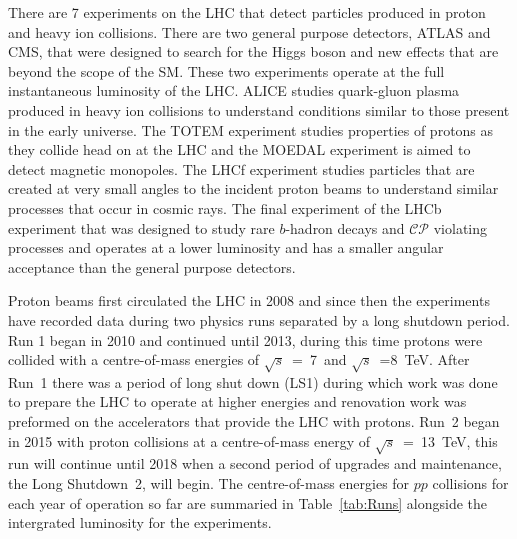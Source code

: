 There are 7 experiments on the LHC that detect particles produced in proton and heavy ion collisions. There are two general purpose detectors, ATLAS and CMS, that were designed to search for the Higgs boson and new effects that are beyond the scope of the SM. These two experiments operate at the full instantaneous luminosity of the LHC. %
ALICE studies quark-gluon plasma produced in heavy ion collisions to understand conditions similar to those present in the early universe. The TOTEM experiment studies properties of protons as they collide head on at the LHC and the MOEDAL experiment is aimed to detect magnetic monopoles. The LHCf experiment studies particles that are created at very small angles to the incident proton beams to understand similar processes that occur in cosmic rays. %
The final experiment of the LHCb experiment that was designed to study rare $b$-hadron decays and $\mathcal{CP}$ violating processes and operates at a lower luminosity and has a smaller angular acceptance than the general purpose detectors. 

Proton beams first circulated the LHC in 2008 and since then the experiments have recorded data during two physics runs separated by a long shutdown period.
Run 1 began in 2010 and continued until 2013, during this time protons were collided with a centre-of-mass energies of $\sqrt{s}$~=~7~and $\sqrt{s}$~=8~TeV. 
After Run~1 there was a period of long shut down (LS1) during which work was done to prepare the LHC to operate at higher energies and renovation work was preformed on the accelerators that provide the LHC with protons.
Run~2 began in 2015 with proton collisions at a centre-of-mass energy of $\sqrt{s}$~=~13~TeV, this run will continue until 2018 when a second period of upgrades and maintenance, the Long Shutdown~2, will begin. The centre-of-mass energies for $pp$ collisions for each year of operation so far are summaried in Table~\ref{tab:Runs} alongside the intergrated luminosity for the experiments.

